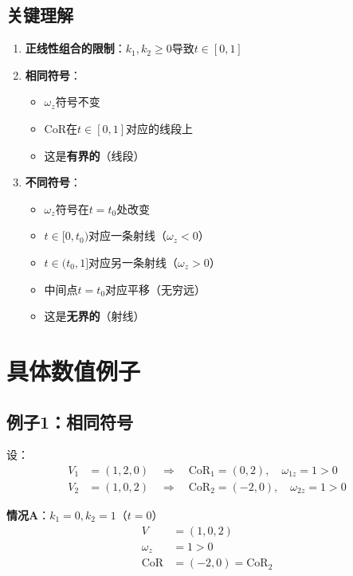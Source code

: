 \documentclass[12pt,a4paper]{article}
\begin{document}
\subsection{关键理解}

\begin{enumerate}
\item \textbf{正线性组合的限制}：$k_1, k_2 \geq 0$导致$t \in [0, 1]$

\item \textbf{相同符号}：
   \begin{itemize}
   \item $\omega_z$符号不变
   \item CoR在$t \in [0, 1]$对应的线段上
   \item 这是\textbf{有界的}（线段）
   \end{itemize}

\item \textbf{不同符号}：
   \begin{itemize}
   \item $\omega_z$符号在$t = t_0$处改变
   \item $t \in [0, t_0)$对应一条射线（$\omega_z < 0$）
   \item $t \in (t_0, 1]$对应另一条射线（$\omega_z > 0$）
   \item 中间点$t = t_0$对应平移（无穷远）
   \item 这是\textbf{无界的}（射线）
   \end{itemize}
\end{enumerate}

\section{具体数值例子}

\subsection{例子1：相同符号}

设：
\begin{align}
V_1 &= (1, 2, 0) \quad \Rightarrow \quad \text{CoR}_1 = (0, 2), \quad \omega_{1z} = 1 > 0 \\
V_2 &= (1, 0, 2) \quad \Rightarrow \quad \text{CoR}_2 = (-2, 0), \quad \omega_{2z} = 1 > 0
\end{align}

\textbf{情况A}：$k_1 = 0, k_2 = 1$（$t = 0$）
\begin{align}
V &= (1, 0, 2) \\
\omega_z &= 1 > 0 \\
\text{CoR} &= (-2, 0) = \text{CoR}_2
\end{align}
\end{document}
